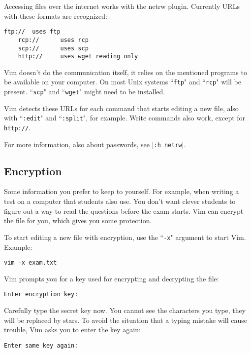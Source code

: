 Accessing files over the internet works with the netrw plugin.
Currently URLs with these formats are recognized:

\begin{Verbatim}[samepage=true]
    ftp:// 	uses ftp
    rcp://      uses rcp
    scp://      uses scp
    http:// 	uses wget reading only
\end{Verbatim}

Vim doesn't do the communication itself, it relies on the mentioned programs to be available on your computer.
On most Unix systems ``\texttt{ftp}" and ``\texttt{rcp}" will be present.
``\texttt{scp}" and ``\texttt{wget}" might need to be installed.

Vim detects these URLs for each command that starts editing a new file, also with ``\texttt{:edit}" and ``\texttt{:split}", for example.
Write commands also work, except for \texttt{http://}.

For more information, also about passwords, see |\texttt{:h netrw}|.
\subsection{Encryption}
Some information you prefer to keep to yourself.
For example, when writing a test on a computer that students also use.
You don't want clever students to figure out a way to read the questions before the exam starts.
Vim can encrypt the file for you, which gives you some protection.

To start editing a new file with encryption, use the ``\texttt{-x}" argument to start Vim.
Example:

\begin{Verbatim}[samepage=true]
 vim -x exam.txt
\end{Verbatim}

Vim prompts you for a key used for encrypting and decrypting the file:

\begin{Verbatim}[samepage=true]
    Enter encryption key: 
\end{Verbatim}

Carefully type the secret key now.
You cannot see the characters you type, they will be replaced by stars.
To avoid the situation that a typing mistake will cause trouble, Vim asks you to enter the key again:

\begin{Verbatim}[samepage=true]
    Enter same key again: 
\end{Verbatim}

